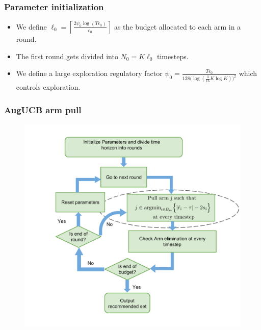 \begin{frame}
\frametitle{Parameter initialization}
\begin{itemize}
\item<1-> We define $\ell_{0} =\left\lceil \frac{2\psi_0\log( T\epsilon_{0})}{\epsilon_{0}} \right\rceil$ as the budget allocated to each arm in a round.
\item<2-> The first round gets divided into $N_{0}=K\ell_{0}$ timesteps.
\item<3-> We define a large exploration regulatory factor $\psi_{0}=\frac{T\epsilon_{0}}{128\Big(\log(\frac{3}{16}K\log K)\Big)^2}$ which controls exploration.
\end{itemize}
\end{frame}

\begin{frame}
\frametitle{AugUCB arm pull}
\begin{figure}
\includegraphics[scale=0.24]{img/AugUCB_flow_armpull.png}
\end{figure}
\end{frame}

